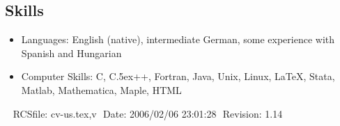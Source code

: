 \documentclass[overlapped,line,draft,11pt,letterpaper]{res}
\def\Cplusplus{{\rm C\raise.5ex\hbox{\small ++}}}
\begin{document}
\begin{resume}
\section{\bf Skills}
\begin{itemize}
\item Languages: English (native), intermediate German,
  some experience with Spanish and Hungarian
\item Computer Skills: C, \Cplusplus, Fortran, Java, Unix, Linux, \LaTeX,
  Stata, Matlab, Mathematica, Maple, HTML
\end{itemize}


\begin{center}
\vspace{\fill}\ \newline
{\tiny \rm $ $RCSfile: cv-us.tex,v $ $ }
{\tiny \rm $ $Date: 2006/02/06 23:01:28 $ $ }
{\tiny \rm $ $Revision: 1.14 $ $ }
\end{center}

\end{resume}
\end{document}
